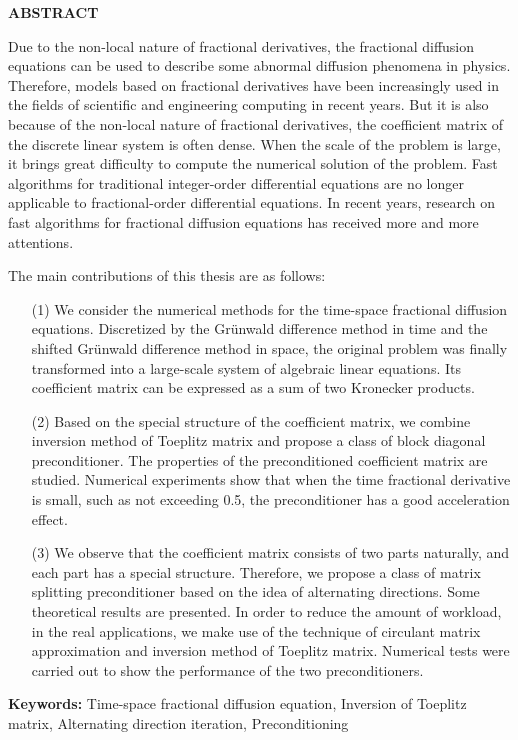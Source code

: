 \thispagestyle{plain}
{}

\centerline{\bfseries ABSTRACT}

\linespread{1.4}
\bigskip


Due to the non-local nature of fractional derivatives,
the fractional diffusion equations 
 can be used to describe some abnormal diffusion phenomena in physics.
Therefore, models based on fractional derivatives 
have been increasingly used in the fields of scientific and engineering computing in recent years.
But it is also because of the non-local nature of fractional derivatives,
the coefficient matrix of the discrete linear system is often dense.
When the scale of the problem is large,
it brings great difficulty to compute the numerical solution of the problem.
Fast algorithms for traditional integer-order differential equations
are no longer applicable to fractional-order differential equations.
In recent years,
research on fast algorithms for fractional diffusion equations has received more and more attentions.

The main contributions of this thesis are as follows:
\begin{itemize}

\item[(1)]
We consider the numerical methods for the time-space fractional diffusion equations.
Discretized by the Gr\"unwald difference method in time and the shifted Gr\"unwald difference method in space,
the original problem was finally transformed into a large-scale system of algebraic linear equations.
Its coefficient matrix can be expressed as a sum of two Kronecker products.
\medskip

\item[(2)]
Based on the special structure of the coefficient matrix,
we combine inversion method of Toeplitz matrix and
propose a class of block diagonal preconditioner.
The properties of the preconditioned coefficient matrix are studied.
Numerical experiments show that
when the time fractional derivative is small, such as not exceeding 0.5,
the preconditioner has a good acceleration effect.
\medskip

\item[(3)]
We observe that the coefficient matrix consists of two parts naturally,
and each part has a special structure.
Therefore, we propose a class of matrix splitting preconditioner 
based on the idea of ​​alternating directions.
Some theoretical results are presented. 
In order to reduce the amount of workload, in the real applications, 
we make use of the technique of circulant matrix approximation and
inversion method of Toeplitz matrix.
Numerical tests were carried out to show the performance of the two preconditioners.
\end{itemize}

\bigskip
\noindent\textbf{ Keywords:}
Time-space fractional diffusion equation, Inversion of Toeplitz matrix, Alternating direction iteration, Preconditioning 